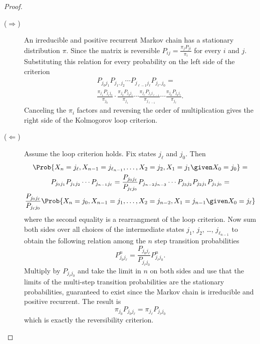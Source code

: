 \documentclass[12pt]{article}
\begin{document}
\begin{proof}
    \begin{description}
        \item[(\(\Rightarrow\))]
            An irreducible and positive recurrent Markov chain has a
            stationary distribution \( \pi \).  Since the matrix is
            reversible \( P_{ij} = \frac{\pi_j P_{ji}}{\pi_i} \) for
            every \( i \) and \( j \).  Substituting this relation for
            every probability on the left side of the criterion
            \begin{multline*}
                P_{j_0 j_1} P_{j_1,j_2} \cdots P_{j_{\ell-1} j_\ell} P_{j_\ell,
                j_0} = \\
                \frac{\pi_{j_1} P_{j_1 j_0}}{\pi_{j_0}} \cdot \frac{\pi_
                {j_2} P_{j_2 j_1}}{\pi_{j_1}} \cdots \frac{\pi_{j_{\ell}}
                P_{j_\ell j_{\ell-1}}}{\pi_{j_{\ell-1}}} \cdots \frac{\pi_{j_0}
                P_{j_0 j_\ell}}{\pi_{j_{\ell}}}.
            \end{multline*}
            Canceling the \( \pi_i \) factors and reversing the order of
            multiplication gives the right side of the Kolmogorov loop
            criterion.
        \item[(\(\Leftarrow\))]
            Assume the loop criterion holds.  Fix states \( j_{\ell} \) and \(
            j_{0} \).  Then
            \begin{multline*}
                \Prob{X_n = j_{\ell}, X_{n-1} = j_{\ell_{n-1}}, \dots, X_2 = j_2, X_1
                = j_1 \given X_0 =j_0} =\\
                P_{j_0 j_1} P_{j_1 j_2} \cdots P_{j_{n-1} j_{\ell}} =
                \frac{P_{j_{0} j_{\ell}}}{P_{j_{\ell} j_{0}}}
                P_{j_{n-2} j_{n-3}} \cdots P_{j_3
                j_2} P_{j_2 j_1} P_{j_1 j_0}= \\
              \frac{P_{j_{0} j_{\ell}}}{P_{j_{\ell} j_{0}}}
              \Prob{X_n = j_0, X_{n-1} = j_1,
                \dots, X_2 = j_{n-2}, X_1 = j_{n-1} \given X_0 = j_{\ell}}
            \end{multline*}
            where the second equality is a rearrangment of the loop criterion.
            Now sum both sides over all choices of the intermediate
            states \( j_1 \), \( j_2 \), \dots, \( j_{\ell_{n-1}} \) to obtain
            the following relation among the \( n \) step transition
            probabilities
            \[
                P_{j_0 j_{\ell}}^{n} = \frac{P_{j_{0}
                    j_{\ell}}}{P_{j_{\ell} j_{0}}} P_{j_{\ell} j_0}^{n}.
            \] Multiply by \( P_{j_{\ell} j_{0}} \) and take the limit in \( n \) on
            both sides and use that the limits of the multi-step
            transition probabilities are the stationary probabilities,
            guaranteed to exist since the Markov chain is irreducible
            and positive recurrent.  The result is
            \[
                \pi_{j_0} P_{j_0 j_{\ell}} = \pi_{j_{\ell}}
                P_{j_{\ell} j_0}
            \] which is exactly the reversibility criterion.
    \end{description}
\end{proof}
\end{document}
